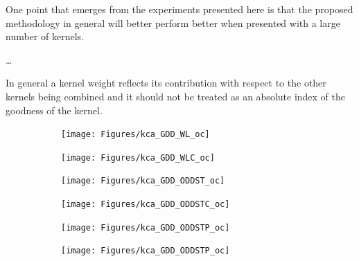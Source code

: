 
One point that emerges from the experiments presented here is that the proposed
methodology in general will better perform better when presented with a large number of kernels.

\dots

In general a kernel weight reflects its contribution with respect to the
other kernels being combined and it should not be treated as an absolute index
of the goodness of the kernel.

\begin{figure}[ht]
    \centering
    \begin{subfigure}{.45\textwidth}
        \centering
        \texttt{[image: Figures/kca\_GDD\_WL\_oc]}
        \label{fig:gdd_wloc}
        \caption{}
    \end{subfigure}
    \begin{subfigure}{.45\textwidth}
        \centering
        \texttt{[image: Figures/kca\_GDD\_WLC\_oc]}
        \label{fig:gdd_wlcoc}
        \caption{}
    \end{subfigure}
    \caption{}
    \label{fig:kca_gdd_wl}
\end{figure}

\begin{figure}[ht]
    \centering
    \begin{subfigure}{.45\textwidth}
        \centering
        \texttt{[image: Figures/kca\_GDD\_ODDST\_oc]}
        \label{fig:gdd_wloc}
        \caption{}
    \end{subfigure}
    \begin{subfigure}{.45\textwidth}
        \centering
        \texttt{[image: Figures/kca\_GDD\_ODDSTC\_oc]}
        \label{fig:gdd_wlcoc}
        \caption{}
    \end{subfigure}
    \caption{}
    \label{fig:kca_gdd_wl}
\end{figure}
\begin{figure}[ht]
    \centering
    \begin{subfigure}{.45\textwidth}
        \centering
        \texttt{[image: Figures/kca\_GDD\_ODDSTP\_oc]}
        \label{fig:gdd_wloc}
        \caption{}
    \end{subfigure}
    \begin{subfigure}{.45\textwidth}
        \centering
        \texttt{[image: Figures/kca\_GDD\_ODDSTP\_oc]}
        \label{fig:gdd_wlcoc}
        \caption{}
    \end{subfigure}
    \caption{}
    \label{fig:kca_gdd_wl}
\end{figure}

